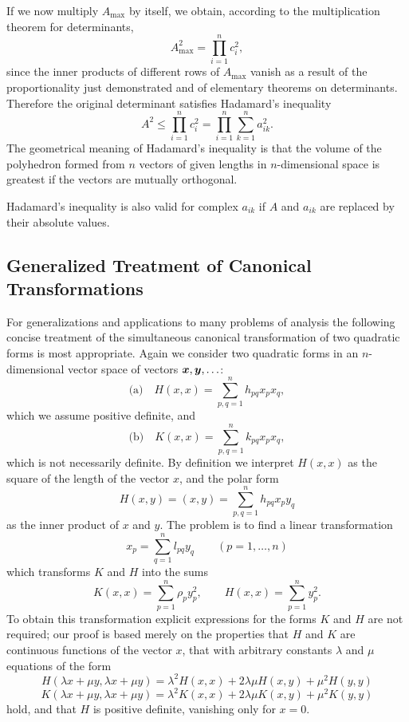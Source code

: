 If we now multiply $A_{\max}$ by itself, we obtain, according to the multiplication theorem for determinants,
\[A_{\max}^2=\prod_{i=1}^{n}c_i^2,\]
since the inner products of different rows of $A_{\max}$ vanish as a result of the proportionality just demonstrated and of elementary theorems on determinants. Therefore the original determinant satisfies Hadamard's inequality
\[A^2\le\prod_{i=1}^{n}c_i^2=\prod_{i=1}^{n}\sum_{k=1}^{n}a_{ik}^2.\]
The geometrical meaning of Hadamard's inequality is that the volume of the polyhedron formed from $n$ vectors of given lengths in $n$-dimensional space is greatest if the vectors are mutually orthogonal.

Hadamard's inequality is also valid for complex $a_{ik}$ if $A$ and $a_{ik}$ are replaced by their absolute values.

\subsection{Generalized Treatment of Canonical Transformations}
For generalizations and applications to many problems of analysis the following concise treatment of the simultaneous canonical transformation of two quadratic forms is most appropriate. Again we consider two quadratic forms in an $n$-dimensional vector space of vectors $\bm{x},\bm{y},\ldots$:
\[
\text{(a)}\quad H(x,x)=\sum_{p,q=1}^{n}h_{pq}x_px_q,
\]
which we assume positive definite, and
\[
\text{(b)}\quad K(x,x)=\sum_{p,q=1}^{n}k_{pq}x_px_q,
\]
which is not necessarily definite. By definition we interpret $H(x,x)$ as the square of the length of the vector $x$, and the polar form
\[
H(x,y)=(x,y)=\sum_{p,q=1}^{n}h_{pq}x_py_q
\]
as the inner product of $x$ and $y$. The problem is to find a linear transformation
\[
x_p=\sum_{q=1}^{n}l_{pq}y_q\qquad(p=1,\ldots,n)
\]
which transforms $K$ and $H$ into the sums
\[
K(x,x)=\sum_{p=1}^{n}\rho_p y_p^2,\qquad H(x,x)=\sum_{p=1}^{n}y_p^2.
\]
To obtain this transformation explicit expressions for the forms $K$ and $H$ are not required; our proof is based merely on the properties that $H$ and $K$ are continuous functions of the vector $x$, that with arbitrary constants $\lambda$ and $\mu$ equations of the form
\begin{equation*}H(\lambda x+\mu y,\lambda x+\mu y)=\lambda^2H(x,x)+2\lambda\mu H(x,y)+\mu^2H(y,y)\tag{47}\end{equation*}
\begin{equation*}K(\lambda x+\mu y,\lambda x+\mu y)=\lambda^2K(x,x)+2\lambda\mu K(x,y)+\mu^2K(y,y)\tag{48}\end{equation*}
hold, and that $H$ is positive definite, vanishing only for $x=0$.

